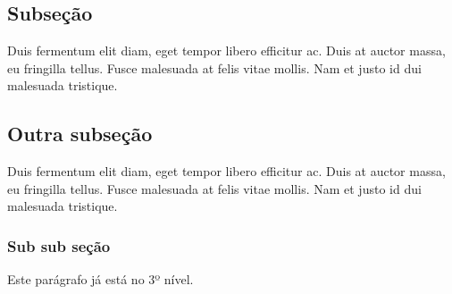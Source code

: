\subsection{Subseção}
Duis fermentum elit diam, eget tempor libero efficitur ac. Duis at auctor massa, eu fringilla tellus. Fusce malesuada at felis vitae mollis. Nam et justo id dui malesuada tristique.

\subsection{Outra subseção}
Duis fermentum elit diam, eget tempor libero efficitur ac. Duis at auctor massa, eu fringilla tellus. Fusce malesuada at felis vitae mollis. Nam et justo id dui malesuada tristique.

\subsubsection{Sub sub seção}
Este parágrafo já está no 3º nível.
